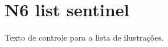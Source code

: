 \documentclass{abntexto-ufc}
\begin{document}
\pretextual

\imprimirlistadeilustracoes

\textual
\section{N6 list sentinel}
Texto de controle para a lista de ilustrações.
\end{document}
